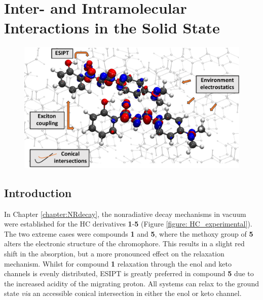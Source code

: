 \chapter[Inter- and Intramolecular Interactions in the Solid State]{Inter- and Intramolecular Interactions in the Solid State}
\label{chapter: Inter}
\begin{figure}[H]
\centering
  \includegraphics[width=0.6\linewidth]{4IntraInterInteractions/2toc.pdf}
\end{figure}
\section{Introduction}\label{section: Inter_Introduction}
In Chapter \ref{chapter:NRdecay}, the nonradiative decay mechanisms in vacuum were established for the \ac{HC} derivatives \textbf{1}-\textbf{5} (Figure \ref{figure: HC_experimental}). The two extreme cases were compounds \textbf{1} and \textbf{5}, where the methoxy group of \textbf{5} alters the electronic structure of the chromophore. This results in a slight red shift in the absorption, but a more pronounced effect on the relaxation mechanism. Whilst for compound \textbf{1} relaxation through the enol and keto channels is evenly distributed, ESIPT is greatly preferred in compound \textbf{5} due to the increased acidity of the migrating proton. All systems can relax to the ground state \textit{via} an accessible conical intersection in either the enol or keto channel.

